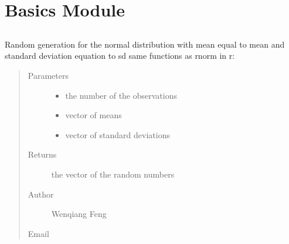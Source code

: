 \documentclass[letterpaper,12pt,english]{sphinxmanual}
\begin{document}
\section{Basics Module}
\label{\detokenize{api:basics-module}}

\subsection{}
\label{\detokenize{api:module-statspy.basics}}\label{\detokenize{api:rnorm}}

\begin{fulllineitems}
\label{\detokenize{api:statspy.basics.rnorm}}
\sphinxAtStartPar
Random generation for the normal distribution with mean
equal to mean and standard deviation equation to sd
same functions as rnorm in r: 
\begin{quote}\begin{description}
\item[{Parameters}] \leavevmode\begin{itemize}
\item {} 
\sphinxAtStartPar
{} \textendash{} the number of the observations

\item {} 
\sphinxAtStartPar
{} \textendash{} vector of means

\item {} 
\sphinxAtStartPar
{} \textendash{} vector of standard deviations

\end{itemize}

\item[{Returns}] \leavevmode
\sphinxAtStartPar
the vector of the random numbers

\item[{Author}] \leavevmode
\sphinxAtStartPar
Wenqiang Feng

\item[{Email}] \leavevmode
\sphinxAtStartPar
{}

\end{description}\end{quote}

\end{fulllineitems}
\end{document}
